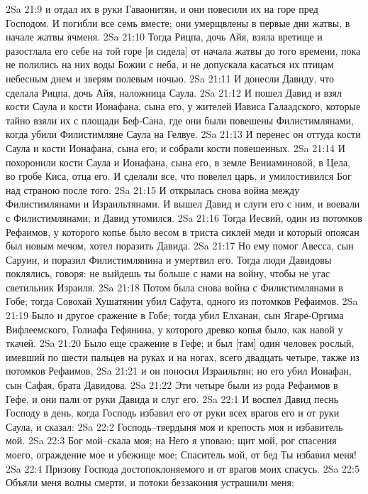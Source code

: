 2Sa 21:9  и отдал их в руки Гаваонитян, и они повесили их на горе пред Господом. И погибли все семь вместе; они умерщвлены в первые дни жатвы, в начале жатвы ячменя.
2Sa 21:10  Тогда Рицпа, дочь Айя, взяла вретище и разостлала его себе на той горе [и сидела] от начала жатвы до того времени, пока не полились на них воды Божии с неба, и не допускала касаться их птицам небесным днем и зверям полевым ночью.
2Sa 21:11  И донесли Давиду, что сделала Рицпа, дочь Айя, наложница Саула.
2Sa 21:12  И пошел Давид и взял кости Саула и кости Ионафана, сына его, у жителей Иависа Галаадского, которые тайно взяли их с площади Беф-Сана, где они были повешены Филистимлянами, когда убили Филистимляне Саула на Гелвуе.
2Sa 21:13  И перенес он оттуда кости Саула и кости Ионафана, сына его; и собрали кости повешенных.
2Sa 21:14  И похоронили кости Саула и Ионафана, сына его, в земле Вениаминовой, в Цела, во гробе Киса, отца его. И сделали все, что повелел царь, и умилостивился Бог над страною после того.
2Sa 21:15  И открылась снова война между Филистимлянами и Израильтянами. И вышел Давид и слуги его с ним, и воевали с Филистимлянами; и Давид утомился.
2Sa 21:16  Тогда Иесвий, один из потомков Рефаимов, у которого копье было весом в триста сиклей меди и который опоясан был новым мечом, хотел поразить Давида.
2Sa 21:17  Но ему помог Авесса, сын Саруин, и поразил Филистимлянина и умертвил его. Тогда люди Давидовы поклялись, говоря: не выйдешь ты больше с нами на войну, чтобы не угас светильник Израиля.
2Sa 21:18  Потом была снова война с Филистимлянами в Гобе; тогда Совохай Хушатянин убил Сафута, одного из потомков Рефаимов.
2Sa 21:19  Было и другое сражение в Гобе; тогда убил Елханан, сын Ягаре-Оргима Вифлеемского, Голиафа Гефянина, у которого древко копья было, как навой у ткачей.
2Sa 21:20  Было еще сражение в Гефе; и был [там] один человек рослый, имевший по шести пальцев на руках и на ногах, всего двадцать четыре, также из потомков Рефаимов,
2Sa 21:21  и он поносил Израильтян; но его убил Ионафан, сын Сафая, брата Давидова.
2Sa 21:22  Эти четыре были из рода Рефаимов в Гефе, и они пали от руки Давида и слуг его.
2Sa 22:1  И воспел Давид песнь Господу в день, когда Господь избавил его от руки всех врагов его и от руки Саула, и сказал:
2Sa 22:2  Господь--твердыня моя и крепость моя и избавитель мой.
2Sa 22:3  Бог мой--скала моя; на Него я уповаю; щит мой, рог спасения моего, ограждение мое и убежище мое; Спаситель мой, от бед Ты избавил меня!
2Sa 22:4  Призову Господа достопоклоняемого и от врагов моих спасусь.
2Sa 22:5  Объяли меня волны смерти, и потоки беззакония устрашили меня;
